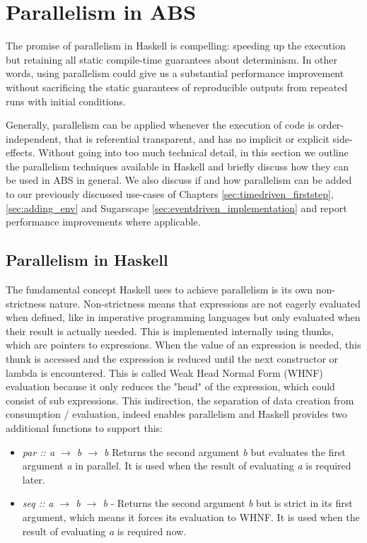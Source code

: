 \section{Parallelism in ABS}
The promise of parallelism in Haskell is compelling: speeding up the execution but retaining all static compile-time guarantees about determinism. In other words, using parallelism could give us a substantial performance improvement without sacrificing the static guarantees of reproducible outputs from repeated runs with initial conditions.

Generally, parallelism can be applied whenever the execution of code is order-independent, that is referential transparent, and has no implicit or explicit side-effects. Without going into too much technical detail, in this section we outline the parallelism techniques available in Haskell and briefly discuss how they can be used in ABS in general. We also discuss if and how parallelism can be added to our previously discussed use-cases of Chapters \ref{sec:timedriven_firststep}, \ref{sec:adding_env} and Sugarscape \ref{sec:eventdriven_implementation} and report performance improvements where applicable.

\subsection{Parallelism in Haskell}
The fundamental concept Haskell uses to achieve parallelism is its own non-strictness nature. Non-strictness means that expressions are not eagerly evaluated when defined, like in imperative programming languages but only evaluated when their result is actually needed. This is implemented internally using thunks, which are pointers to expressions. When the value of an expression is needed, this thunk is accessed and the expression is reduced until the next constructor or lambda is encountered. This is called Weak Head Normal Form (WHNF) evaluation because it only reduces the "head" of the expression, which could consist of sub expressions. This indirection, the separation of data creation from consumption / evaluation, indeed enables parallelism and Haskell provides two additional functions to support this:

\begin{itemize}
	\item \textit{par :: a $\rightarrow$ b $\rightarrow$ b} Returns the second argument \textit{b} but evaluates the first argument \textit{a} in parallel. It is used when the result of evaluating \textit{a} is required later.
	
	\item \textit{seq :: a $\rightarrow$ b $\rightarrow$ b} - Returns the second argument \textit{b} but is strict in its first argument, which means it forces its evaluation to WHNF. It is used when the result of evaluating \textit{a} is required now.
\end{itemize}

